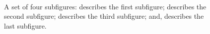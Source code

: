 \documentclass{standalone}
\begin{document}
 	\begin{figure}
    	\centering
		\hspace{8pt}
		 \\
		\hspace{8pt}
		\caption[A set of four subfigures.]{A set of four subfigures:
			 describes the first subfigure;
			 describes the second subfigure;
			 describes the third subfigure; and,
			 describes the last subfigure.}
		\label{fig:ex3}
	\end{figure}
\end{document}
